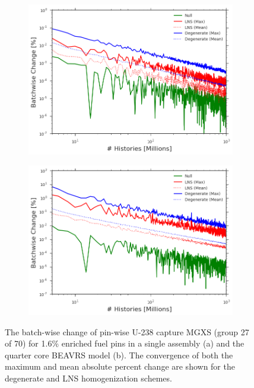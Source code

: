 \clearpage


\begin{figure}[h!]
\centering
\begin{subfigure}{.87\textwidth}
  \centering
  \includegraphics[width=\linewidth]{figures/patterns/convergence/assm-16/assm-16-capt}
  \caption{}
  \label{fig:chap9-assm-16-converge}
\end{subfigure}
\begin{subfigure}{.87\textwidth}
  \centering
  \includegraphics[width=\linewidth]{figures/patterns/convergence/full-core/16-enr-capt}
  \caption{}
  \label{fig:chap9-reflector-converge}
\end{subfigure}
\caption[Convergence of pin-wise U-238 capture MGXS]{The batch-wise change of pin-wise U-238 capture \ac{MGXS} (group 27 of 70) for 1.6\% enriched fuel pins in a single assembly (a) and the quarter core \ac{BEAVRS} model (b). The convergence of both the maximum and mean absolute percent change are shown for the degenerate and \ac{LNS} homogenization schemes.}
\label{fig:chap9-converge}
\end{figure}
